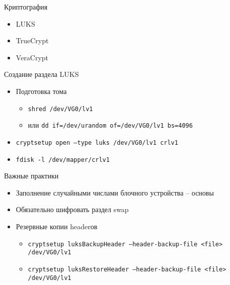 \begin{frame}{Криптография}
  \begin{itemize}
    \item LUKS
    \item TrueCrypt
    \item VeraCrypt
   \end{itemize}
\end{frame}

\begin{frame}{Создание раздела LUKS}
 \begin{itemize}
   \item Подготовка тома
      \begin{itemize}
        \item {\tt shred /dev/VG0/lv1}
        \item или {\tt dd if=/dev/urandom of=/dev/VG0/lv1 bs=4096 }
      \end{itemize}
   \item {\tt cryptsetup open --type luks /dev/VG0/lv1 crlv1}
   \item {\tt fdisk -l /dev/mapper/crlv1 }
 \end{itemize}
\end{frame}

\begin{frame}{Важные практики}
  \begin{itemize}
    \item Заполнение случайными числами блочного устройства -- основы
    \item Обязательно шифровать раздел swap
    \item Резервные копии headerов
      \begin{itemize}
        \item {\tt cryptsetup luksBackupHeader --header-backup-file <file> /dev/VG0/lv1 }
        \item {\tt cryptsetup luksRestoreHeader --header-backup-file <file> /dev/VG0/lv1 }
      \end{itemize}
  \end{itemize}
\end{frame}
  
